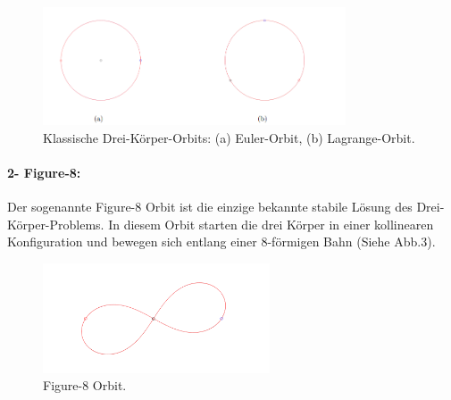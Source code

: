 \documentclass[a4paper,12pt,twoside]{article}
\begin{document}
\begin{figure}[H]
	\centering
	\includegraphics[width=0.8\textwidth]{EulerUndLagrange.png}
	\caption[Eintrag in Abbildungsverzeichnis von Grumpy Cat]{Klassische Drei-Körper-Orbits: (a) Euler-Orbit, (b) Lagrange-Orbit.}
	\label{EulerUndLagrange .}
\end{figure}

\paragraph{2- Figure-8: }
Der sogenannte Figure-8 Orbit ist die einzige bekannte stabile Lösung des Drei-Körper-Problems. In diesem Orbit starten die drei Körper in einer kollinearen Konfiguration und bewegen sich entlang einer 8-förmigen Bahn (Siehe Abb.3).

\begin{figure}[H]
    \centering
    \includegraphics[width=0.6\textwidth]{figure8Orbit.png}
    \caption{Figure-8 Orbit.}
    \label{fig:figure8Orbit}
\end{figure}
\end{document}
